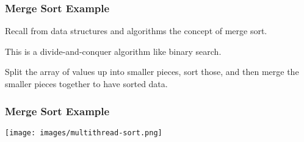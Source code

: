 \begin{frame}
	\frametitle{Merge Sort Example}

	Recall from data structures and algorithms the concept of merge sort.

	This is a divide-and-conquer algorithm like binary search.

	Split the array of values up into smaller pieces, sort those, and then merge the smaller pieces together to have sorted data.


\end{frame}


\begin{frame}
	\frametitle{Merge Sort Example}

	\begin{center}
		\texttt{[image: images/multithread-sort.png]}
	\end{center}


\end{frame}




